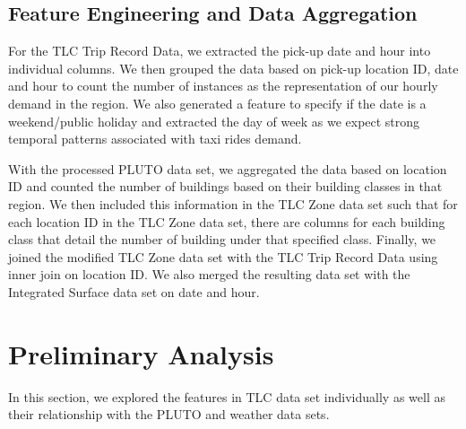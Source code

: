 \documentclass[11pt]{article}
\begin{document}
\subsection{Feature Engineering and Data Aggregation}
For the TLC Trip Record Data, we extracted the pick-up date and hour into individual columns. We then grouped the data based on pick-up location ID, date and hour to count the number of instances as the representation of our hourly demand in the region. We also generated a feature to specify if the date is a weekend/public holiday and extracted the day of week as we expect strong temporal patterns associated with taxi rides demand.

With the processed PLUTO data set, we aggregated the data based on location ID and counted the number of buildings based on their building classes in that region. We then included this information in the TLC Zone data set such that for each location ID in the TLC Zone data set, there are columns for each building class that detail the number of building under that specified class. Finally, we joined the modified TLC Zone data set with the TLC Trip Record Data using inner join on location ID. We also merged the resulting data set with the Integrated Surface data set on date and hour.

\section{Preliminary Analysis}
\label{analysis}
In this section, we explored the features in TLC data set individually as well as their relationship with the PLUTO and weather data sets. 
\end{document}
